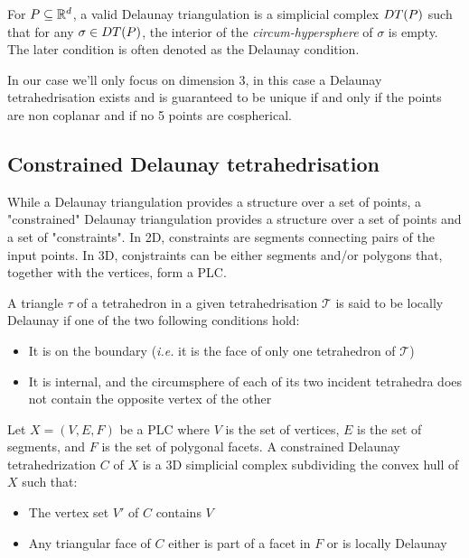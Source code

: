 \documentclass[11pt]{article}
\begin{document}
\begin{definition}

	For $P\subseteq\mathbb{R}^{d}$, a valid Delaunay triangulation is a  simplicial complex $DT(P)$ such
	that for any $\sigma\in DT(P)$, the interior of the \emph{circum-hypersphere} of $\sigma$ is empty. The later condition is often denoted as the Delaunay condition.

\end{definition}

\begin{remark}

	In our case we'll only focus on dimension 3, in this case a Delaunay tetrahedrisation exists and is
	guaranteed to be unique if and only if the points are non coplanar and if no 5 points are cospherical.

\end{remark}

\subsection{Constrained Delaunay tetrahedrisation}

While a Delaunay triangulation provides a structure over a set of points, a "constrained" Delaunay triangulation provides a structure over a set of points and a set of "constraints". In 2D, constraints are segments connecting pairs of the input points. In 3D, conjstraints can be either segments and/or polygons that, together with the vertices, form a PLC.

\begin{definition}
	A triangle $\tau$ of a tetrahedron in a given tetrahedrisation $\mathcal{T}$ is said to be locally Delaunay if one of the two following conditions hold:
	\begin{itemize}
		\item It is on the boundary (\emph{i.e.} it is the face of only one tetrahedron of $\mathcal{T}$)
		\item It is internal, and the circumsphere of each of its two incident tetrahedra does not contain the
		      opposite vertex of the other
	\end{itemize}
\end{definition}

\begin{definition}
	Let $X = (V, E, F)$ be a PLC where $V$ is the set of vertices, $E$ is the set of segments, and $F$ is the
	set of polygonal facets. A constrained Delaunay tetrahedrization $C$ of $X$ is a 3D simplicial complex
	subdividing the convex hull of $X$ such that:
	\begin{itemize}
		\item The vertex set $V'$ of $C$ contains $V$
		\item Any triangular face of $C$ either is part of a facet in $F$ or is locally Delaunay
	\end{itemize}

\end{definition}
\end{document}
